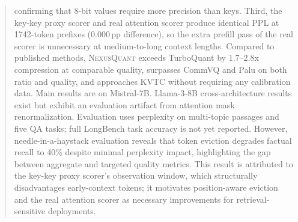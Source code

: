 \begin{abstract}
confirming that 8-bit values require more precision than keys. Third, the key-key proxy scorer and real attention scorer produce identical PPL at 1742-token prefixes (0.000\,pp difference), so the extra prefill pass of the real scorer is unnecessary at medium-to-long context lengths. Compared to published methods, \textsc{NexusQuant} exceeds TurboQuant by 1.7--2.8x compression at comparable quality, surpasses CommVQ and Palu on both ratio and quality, and approaches KVTC without requiring any calibration data. Main results are on Mistral-7B. Llama-3-8B cross-architecture results exist but exhibit an evaluation artifact from attention mask renormalization. Evaluation uses perplexity on multi-topic passages and five QA tasks; full LongBench task accuracy is not yet reported. However, needle-in-a-haystack evaluation reveals that token eviction degrades factual recall to 40\% despite minimal perplexity impact, highlighting the gap between aggregate and targeted quality metrics. This result is attributed to the key-key proxy scorer's observation window, which structurally disadvantages early-context tokens; it motivates position-aware eviction and the real attention scorer as necessary improvements for retrieval-sensitive deployments.
\end{abstract}
